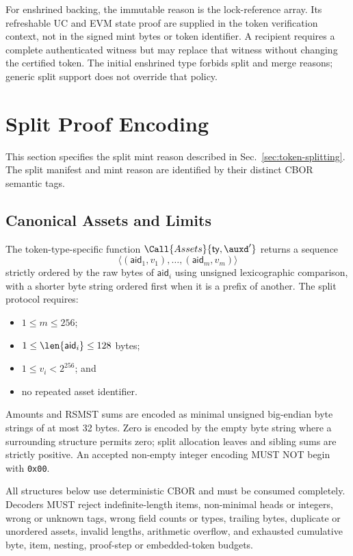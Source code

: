 For enshrined backing, the immutable reason is the lock-reference array. Its refreshable UC and EVM state proof are supplied in the token verification context, not in the signed mint bytes or token identifier. A recipient requires a complete authenticated witness but may replace that witness without changing the certified token. The initial enshrined type forbids split and merge reasons; generic split support does not override that policy.

\section{Split Proof Encoding}\label{app:split-proof-encoding}

This section specifies the split mint reason described in Sec.~\ref{sec:token-splitting}. The split manifest and mint reason are identified by their distinct CBOR semantic tags.

\subsection{Canonical Assets and Limits}

The token-type-specific function $\Call{Assets}{\mathsf{ty},\auxd'}$ returns a sequence
\[
\langle(\mathsf{aid}_1,v_1),\ldots,(\mathsf{aid}_m,v_m)\rangle
\]
strictly ordered by the raw bytes of $\mathsf{aid}_i$ using unsigned lexicographic comparison, with a shorter byte string ordered first when it is a prefix of another. The split protocol requires:
\begin{itemize}
	\item $1 \leq m \leq 256$;
	\item $1 \leq \len{\mathsf{aid}_i} \leq 128$ bytes;
	\item $1 \leq v_i < 2^{256}$; and
	\item no repeated asset identifier.
\end{itemize}
Amounts and RSMST sums are encoded as minimal unsigned big-endian byte strings of at most 32 bytes. Zero is encoded by the empty byte string where a surrounding structure permits zero; split allocation leaves and sibling sums are strictly positive. An accepted non-empty integer encoding MUST NOT begin with \texttt{0x00}.

All structures below use deterministic CBOR and must be consumed completely. Decoders MUST reject indefinite-length items, non-minimal heads or integers, wrong or unknown tags, wrong field counts or types, trailing bytes, duplicate or unordered assets, invalid lengths, arithmetic overflow, and exhausted cumulative byte, item, nesting, proof-step or embedded-token budgets.


